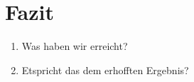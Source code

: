 \documentclass[12pt]{article}
\begin{document}
\section{Fazit}
\begin{enumerate}
    \item Was haben wir erreicht?\\
    \item Etspricht das dem erhofften Ergebnis?\\
\end{enumerate}
\end{document}
